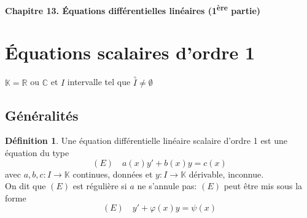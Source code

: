 \documentclass[10pt,a4paper]{article}
\theoremstyle{definition}
\newtheorem{definition}[proposition]{Définition}
\begin{document}
\renewcommand{\labelitemi}{\textbullet}
\begin{center}
{\Large \textbf{Chapitre 13. Équations différentielles linéaires (1\textsuperscript{ère} partie)}}
\end{center}

\section{Équations scalaires d'ordre 1}
\noindent $\mathbb{K} = \mathbb{R}$ ou $\mathbb{C}$ et $I$ intervalle tel que $\overset{\circ}{I} \neq \emptyset$

\subsection{Généralités}
\begin{definition}
    Une équation différentielle linéaire scalaire d'ordre 1 est une équation du type
    \[(E) \quad a(x)y' + b(x)y = c(x)\]
    avec \(a, b, c: I \to \mathbb{K}\) continues, données et \(y: I \to \mathbb{K}\) dérivable, inconnue. \\
    On dit que \((E)\) est régulière si \(a\) ne s'annule pas: \((E)\) peut être mis sous la forme
    \[(E) \quad y' + \varphi(x)y = \psi(x)\]
\end{definition}
\end{document}
